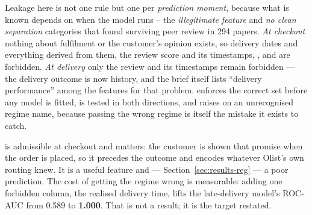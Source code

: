 Leakage here is not one rule but one per \emph{prediction moment}, because what
is known depends on when the model runs -- the \emph{illegitimate feature} and
\emph{no clean separation} categories that \citet{kapoor2023leakage} found
surviving peer review in 294 papers. \emph{At checkout} nothing about
fulfilment or the customer's opinion exists, so delivery dates and everything
derived from them, the review score and its timestamps,
,  and
 are forbidden. \emph{At delivery} only the review and its
timestamps remain forbidden --- the delivery outcome is now history, and the
brief itself lists ``delivery performance'' among the features for that problem.
 enforces the correct set before any
model is fitted, is tested in both directions, and raises on an unrecognised
regime name, because passing the wrong regime is itself the mistake it exists to
catch.

 is admissible at checkout and matters:
the customer is shown that promise when the order is placed, so it precedes the
outcome and encodes whatever Olist's own routing knew. It is a useful feature and
--- Section~\ref{sec:results-reg} --- a poor prediction. The cost of getting the
regime wrong is measurable: adding one forbidden column, the realised delivery
time, lifts the late-delivery model's ROC-AUC from 0.589 to \textbf{1.000}. That
is not a result; it is the target restated.
